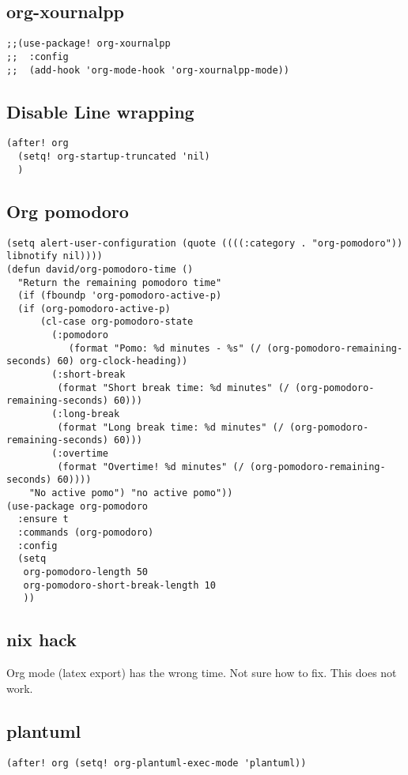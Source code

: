 \documentclass[11pt]{article}
\begin{document}
\subsection{org-xournalpp}
\label{sec:org243a9a5}
\begin{verbatim}
;;(use-package! org-xournalpp
;;  :config
;;  (add-hook 'org-mode-hook 'org-xournalpp-mode))

\end{verbatim}
\subsection{Disable Line wrapping}
\label{sec:orgf8c9715}
\begin{verbatim}
(after! org
  (setq! org-startup-truncated 'nil)
  )
\end{verbatim}
\subsection{Org pomodoro}
\label{sec:org63594bc}
\begin{verbatim}
(setq alert-user-configuration (quote ((((:category . "org-pomodoro")) libnotify nil))))
(defun david/org-pomodoro-time ()
  "Return the remaining pomodoro time"
  (if (fboundp 'org-pomodoro-active-p)
  (if (org-pomodoro-active-p)
      (cl-case org-pomodoro-state
        (:pomodoro
           (format "Pomo: %d minutes - %s" (/ (org-pomodoro-remaining-seconds) 60) org-clock-heading))
        (:short-break
         (format "Short break time: %d minutes" (/ (org-pomodoro-remaining-seconds) 60)))
        (:long-break
         (format "Long break time: %d minutes" (/ (org-pomodoro-remaining-seconds) 60)))
        (:overtime
         (format "Overtime! %d minutes" (/ (org-pomodoro-remaining-seconds) 60))))
    "No active pomo") "no active pomo"))
(use-package org-pomodoro
  :ensure t
  :commands (org-pomodoro)
  :config
  (setq
   org-pomodoro-length 50
   org-pomodoro-short-break-length 10
   ))
\end{verbatim}

\subsection{nix hack}
\label{sec:org737c7f9}
Org mode (latex export) has the wrong time. Not sure how to fix. This does not work.
\subsection{plantuml}
\label{sec:orge7d5b00}
\begin{verbatim}
(after! org (setq! org-plantuml-exec-mode 'plantuml))
\end{verbatim}
\end{document}
